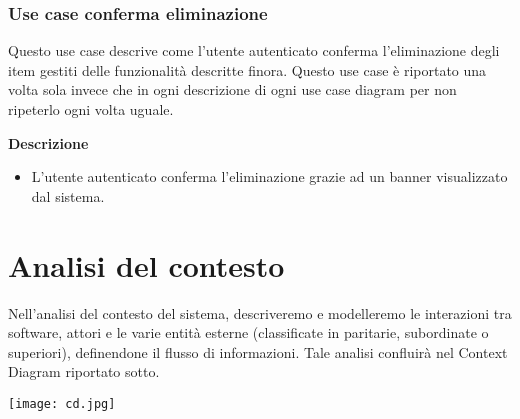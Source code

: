 \documentclass[a4paper,12pt]{article}
\begin{document}
\subsubsection*{Use case conferma eliminazione}

 Questo use case descrive come l'utente autenticato conferma l'eliminazione degli item gestiti delle funzionalità descritte finora.
 Questo use case è riportato una volta sola invece che in ogni descrizione di ogni use case diagram per non ripeterlo ogni volta uguale. 
 
\textbf{Descrizione}
\begin{itemize} \setlength\itemsep{0.01em}
\item L'utente autenticato conferma l'eliminazione grazie ad un banner visualizzato dal sistema.
\end{itemize}




\newpage
\section*{Analisi del contesto}
Nell'analisi del contesto del sistema, descriveremo e modelleremo le interazioni tra software, attori e le varie entità esterne (classificate in paritarie, subordinate o superiori), definendone il flusso di informazioni. Tale analisi confluirà nel Context Diagram riportato sotto.

\begin{center}
  \texttt{[image: cd.jpg]}
\end{center}
\end{document}
